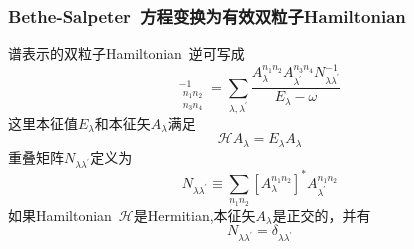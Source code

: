 \documentclass[cjk,slidestop,compress,mathserif,blue]{beamer}
\begin{document}
\frame
{
	\frametitle{\textrm{Bethe-Salpeter~}方程变换为有效双粒子\textrm{Hamiltonian}}
	谱表示的双粒子\textrm{Hamiltonian~}逆可写成
	\begin{displaymath}
		[\mathcal{H}-\mathcal{I}\omega]_{
			\substack{
				n_1 n_2\\
				n_3 n_4
			} }^{-1}=\sum_{\lambda,\lambda^{\prime}}\frac{A_{\lambda}^{n_1n_2}A_{\lambda^{\prime}}^{n_3n_4}N_{\lambda\lambda^{\prime}}^{-1}}{E_{\lambda}-\omega}
	\end{displaymath}
	这里本征值$E_{\lambda}$和本征矢$A_{\lambda}$满足
	\begin{displaymath}
		\mathcal{H}A_{\lambda}=E_{\lambda}A_{\lambda}
	\end{displaymath}
	重叠矩阵$N_{\lambda\lambda^{\prime}}$定义为
	\begin{displaymath}
		N_{\lambda\lambda^{\prime}}\equiv\sum_{n_1n_2}[A_{\lambda}^{n_1n_2}]^{\ast}A_{\lambda^{\prime}}^{n_1n_2}
	\end{displaymath}
	如果\textrm{Hamiltonian~}$\mathcal{H}$是\textrm{Hermitian},本征矢$A_{\lambda}$是正交的，并有
	\begin{displaymath}
		N_{\lambda\lambda^{\prime}}=\delta_{\lambda\lambda^{\prime}}
	\end{displaymath}
}
\end{document}
